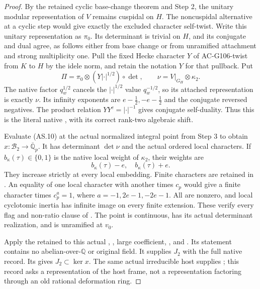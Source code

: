 \begin{proof}
By the retained cyclic base-change theorem and Step 2,
the unitary modular representation of \(V\) remains cuspidal
on \(H\).  The noncuspidal alternative at a cyclic step
would give exactly the excluded character self-twist.
Write this unitary representation as \(\pi_0\).
Its determinant is trivial on \(H\), and its conjugate and
dual agree, as follows either from base change or from
unramified attachment and strong multiplicity one.
Pull the fixed Hecke character \(Y\) of AC-G106-twist from
\(K\) to \(H\) by the idele norm, and retain the notation
\(Y\) for that pullback.  Put
\[
 \Pi=\pi_0\otimes(Y|\cdot|^{1/2})\circ\det,\qquad
                       \nu=V|_{G_H}\otimes\kappa_2 .
 \tag{AS.11}
\]
The native  factor \(q_w^{1/2}\) cancels the
\(|\cdot|^{1/2}\) value \(q_w^{-1/2}\), so its attached
representation is exactly \(\nu\).  Its infinity exponents
are \(e-\tfrac12,-e-\tfrac12\) and the conjugate reversed
negatives.  The product relation \(YY^c=|\cdot|^{-1}\)
gives conjugate self-duality.  Thus this is the literal
native , with its correct rank-two
algebraic shift.

Evaluate (AS.10) at the actual normalized integral point
from Step 3 to obtain \(x:\mathscr B_2\to\overline{\mathbb Q}_p\).
It has determinant \(\det\nu\) and the actual ordered
local characters.  If \(b_\kappa(\tau)\in\{0,1\}\) is
the native local weight of \(\kappa_2\), their weights are
\[
                 b_\kappa(\tau)-e,\quad b_\kappa(\tau)+e .
 \tag{AS.12}
\]
They increase strictly at every local embedding.
Finite characters are retained in .
An equality of one local character with another times
\(c_p\) would give a finite character times
\(c_p^a=1\), where \(a=-1,2e-1,-2e-1\).
All are nonzero, and local cyclotomic inertia has infinite
image on every finite extension.  These verify every
flag and non-ratio clause of .
The point is continuous, has its actual determinant
realization, and is unramified at \(v_0\).

Apply the retained  to this actual
, , large coefficient,
, and .  Its statement contains
no abelian-over-\(\mathbb Q\) or original  field.
It supplies \(J_2\) with the full native 
record.  Its  gives \(J_2\subset\ker x\).
The same actual irreducible host  supplies
; this record asks a
representation of the host frame, not a representation
factoring through an old rational deformation ring.


\end{proof}
